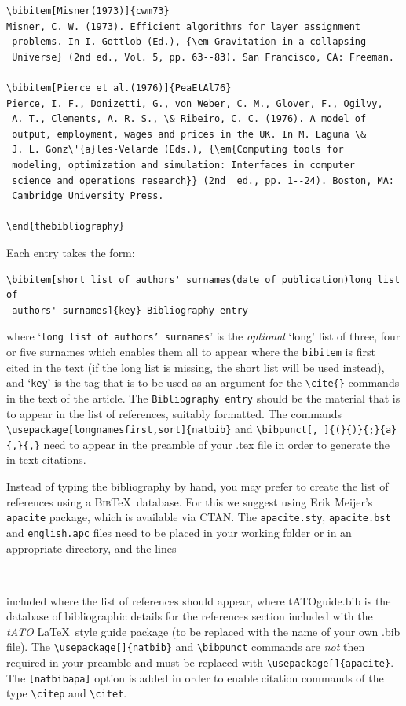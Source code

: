 \documentclass{tATO2e}
\begin{document}
\begin{verbatim}
\bibitem[Misner(1973)]{cwm73}
Misner, C. W. (1973). Efficient algorithms for layer assignment
 problems. In I. Gottlob (Ed.), {\em Gravitation in a collapsing
 Universe} (2nd ed., Vol. 5, pp. 63--83). San Francisco, CA: Freeman.

\bibitem[Pierce et al.(1976)]{PeaEtAl76}
Pierce, I. F., Donizetti, G., von Weber, C. M., Glover, F., Ogilvy,
 A. T., Clements, A. R. S., \& Ribeiro, C. C. (1976). A model of
 output, employment, wages and prices in the UK. In M. Laguna \&
 J. L. Gonz\'{a}les-Velarde (Eds.), {\em{Computing tools for
 modeling, optimization and simulation: Interfaces in computer
 science and operations research}} (2nd  ed., pp. 1--24). Boston, MA:
 Cambridge University Press.

\end{thebibliography}
\end{verbatim}
\medskip
\noindent Each entry takes the form:

\begin{verbatim}
\bibitem[short list of authors' surnames(date of publication)long list of
 authors' surnames]{key} Bibliography entry
\end{verbatim}

\noindent where `\texttt{long list of authors' surnames}' is the \emph{optional} `long' list of three, four or five surnames which enables them all to appear where the \verb"bibitem" is first cited in the text (if the long list is missing, the short list will be used instead), and `{\tt key}' is the tag that is to be used as an argument for the \verb"\cite{}" commands in the text of the article. The {\tt Bibliography entry} should be the material that is to appear in the list of references, suitably formatted. The commands \verb"\usepackage[longnamesfirst,sort]{natbib}" and \verb"\bibpunct[, ]{(}{)}{;}{a}{,}{,}" need to appear in the preamble of your .tex file in order to generate the in-text citations.

Instead of typing the bibliography by hand, you may prefer to create the list of references using a \textsc{Bib}\TeX\ database. For this we suggest using Erik Meijer's \texttt{apacite} package, which is available via CTAN. The \verb"apacite.sty", \verb"apacite.bst" and \verb"english.apc" files need to be placed in your working folder or in an appropriate directory, and the lines
%
\begin{verbatim}


\end{verbatim}
%
\noindent included where the list of references should appear, where tATOguide.bib is the database of bibliographic details for the references section included with the {\itshape tATO} \LaTeX\ style guide package (to be replaced with the name of your own .bib file). The \verb"\usepackage[]{natbib}" and \verb"\bibpunct" commands are \emph{not} then required in your preamble and must be replaced with \verb"\usepackage[]{apacite}". The \verb"[natbibapa]" option is added in order to enable citation commands of the type \verb"\citep" and \verb"\citet".
\end{document}

